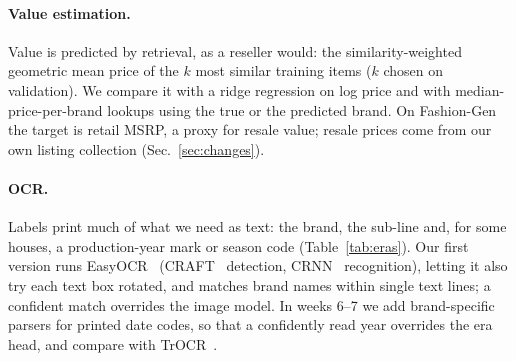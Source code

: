 \paragraph{Value estimation.}
Value is predicted by retrieval, as a reseller would: the similarity-weighted geometric mean price
of the $k$ most similar training items ($k$ chosen on validation). We compare it with a ridge
regression on log price and with median-price-per-brand lookups using the true or the
predicted brand. On Fashion-Gen the target is retail MSRP, a proxy for resale value; resale
prices come from our own listing collection (Sec.~\ref{sec:changes}).

\paragraph{OCR.}
Labels print much of what we need as text: the brand, the sub-line and, for some houses, a
production-year mark or season code (Table~\ref{tab:eras}). Our first version runs
EasyOCR~\cite{easyocr} (CRAFT~\cite{baek2019craft} detection, CRNN~\cite{shi2017crnn} recognition),
letting it also try each text box rotated, and matches brand names within single text lines; a
confident match overrides the image model. In weeks 6--7 we add brand-specific parsers for printed
date codes, so that a confidently read year overrides the era head, and compare with
TrOCR~\cite{li2023trocr}.

